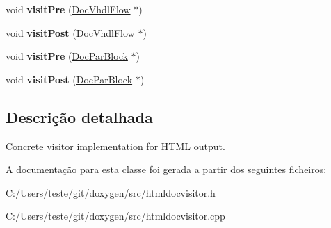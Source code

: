 \begin{DoxyCompactItemize}
\item 
\hypertarget{class_html_doc_visitor_ab7c53055027c60e0a3a9f4f93e9c3d85}{void {\bfseries visit\-Pre} (\hyperlink{class_doc_vhdl_flow}{Doc\-Vhdl\-Flow} $\ast$)}\label{class_html_doc_visitor_ab7c53055027c60e0a3a9f4f93e9c3d85}

\item 
\hypertarget{class_html_doc_visitor_a79febe42f6e032c27aad9a418f979eca}{void {\bfseries visit\-Post} (\hyperlink{class_doc_vhdl_flow}{Doc\-Vhdl\-Flow} $\ast$)}\label{class_html_doc_visitor_a79febe42f6e032c27aad9a418f979eca}

\item 
\hypertarget{class_html_doc_visitor_acc4035c695184dd01a26145a88c1a588}{void {\bfseries visit\-Pre} (\hyperlink{class_doc_par_block}{Doc\-Par\-Block} $\ast$)}\label{class_html_doc_visitor_acc4035c695184dd01a26145a88c1a588}

\item 
\hypertarget{class_html_doc_visitor_a4bd3a84f45e2f6dc6420638ee8e4ee27}{void {\bfseries visit\-Post} (\hyperlink{class_doc_par_block}{Doc\-Par\-Block} $\ast$)}\label{class_html_doc_visitor_a4bd3a84f45e2f6dc6420638ee8e4ee27}

\end{DoxyCompactItemize}


\subsection{Descrição detalhada}
Concrete visitor implementation for H\-T\-M\-L output. 

A documentação para esta classe foi gerada a partir dos seguintes ficheiros\-:\begin{DoxyCompactItemize}
\item 
C\-:/\-Users/teste/git/doxygen/src/htmldocvisitor.\-h\item 
C\-:/\-Users/teste/git/doxygen/src/htmldocvisitor.\-cpp\end{DoxyCompactItemize}
